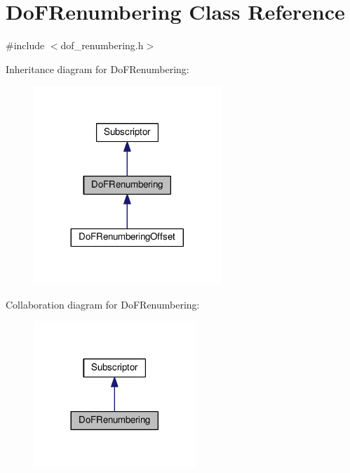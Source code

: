 \hypertarget{class_do_f_renumbering}{}\section{Do\+F\+Renumbering Class Reference}
\label{class_do_f_renumbering}


{\ttfamily \#include $<$dof\+\_\+renumbering.\+h$>$}



Inheritance diagram for Do\+F\+Renumbering\+:
\nopagebreak
\begin{figure}[H]
\begin{center}
\leavevmode
\includegraphics[width=200pt]{class_do_f_renumbering__inherit__graph}
\end{center}
\end{figure}


Collaboration diagram for Do\+F\+Renumbering\+:
\nopagebreak
\begin{figure}[H]
\begin{center}
\leavevmode
\includegraphics[width=173pt]{class_do_f_renumbering__coll__graph}
\end{center}
\end{figure}
